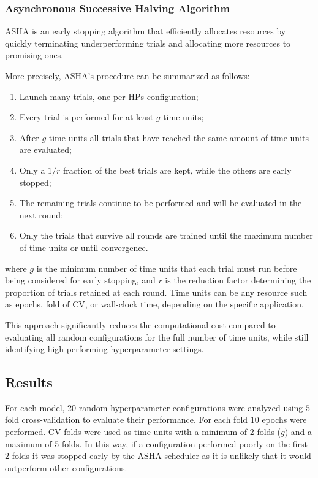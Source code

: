 \subsubsection{Asynchronous Successive Halving Algorithm}
ASHA is an early stopping algorithm that efficiently 
allocates resources by quickly terminating underperforming trials and allocating more resources to promising ones.

More precisely, ASHA's procedure can be summarized as follows:
\begin{enumerate}
    \item Launch many trials, one per HPs configuration;
    \item Every trial is performed for at least $g$ time units;
    \item After $g$ time units all trials that have reached the same amount of time units are evaluated;
    \item Only a $1/r$ fraction of the best trials are kept, while the others are early stopped;
    \item The remaining trials continue to be performed and will be evaluated in the next round;
    \item Only the trials that survive all rounds are trained until the maximum number of time units or until
    convergence.
\end{enumerate}

where $g$ is the minimum number of time units that each trial must run before being considered for early stopping,
and $r$ is the reduction factor determining the proportion of trials retained at each round. Time units can be any
resource such as epochs, fold of CV, or wall-clock time, depending on the specific application.

This approach significantly reduces the computational cost compared to evaluating all random configurations for the full
number of time units, while still identifying high-performing hyperparameter settings.

\subsection{Results}

For each model, 20 random hyperparameter configurations were analyzed using $5$-fold cross-validation to evaluate their performance. For each fold 10 epochs were performed. CV folds were used as time units with a minimum of 2 folds ($g$) and a maximum of 5 folds. In this way, if a configuration performed poorly on the first 2 folds it was stopped early by the ASHA scheduler as it is unlikely that it would outperform other configurations.

